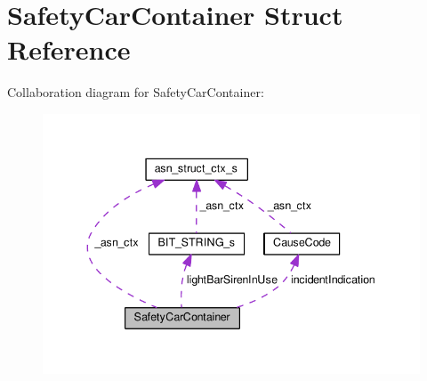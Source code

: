 \hypertarget{structSafetyCarContainer}{}\section{Safety\+Car\+Container Struct Reference}
\label{structSafetyCarContainer}


Collaboration diagram for Safety\+Car\+Container\+:\nopagebreak
\begin{figure}[H]
\begin{center}
\leavevmode
\includegraphics[width=340pt]{structSafetyCarContainer__coll__graph}
\end{center}
\end{figure}
